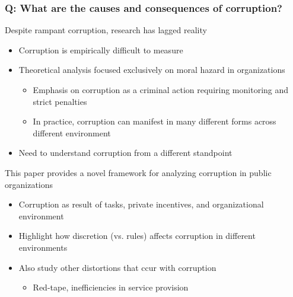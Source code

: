 \documentclass[aspectratio=169]{beamer}
\begin{document}
\begin{frame}
\frametitle{Q: What are the causes and consequences of corruption?}
Despite rampant corruption, research has lagged reality
\begin{itemize}\setlength\itemsep{3pt}
\item Corruption is empirically difficult to measure
\item Theoretical analysis focused exclusively on moral hazard in organizations
\begin{itemize}\setlength\itemsep{3pt}
\item Emphasis on corruption as a criminal action requiring monitoring and strict penalties 
  \item In practice, corruption can manifest in many different forms across different environment
\end{itemize}
\item Need to understand corruption from a different standpoint
\end{itemize}\medskip
This paper provides a novel framework for analyzing corruption in public organizations
\begin{itemize}\setlength\itemsep{3pt}
\item Corruption as result of tasks, private incentives, and organizational environment
\item Highlight how discretion (vs. rules) affects corruption in different environments
\item Also study other distortions that ccur with corruption 
\begin{itemize}\setlength\itemsep{3pt}
\item Red-tape, inefficiencies in service provision
\end{itemize}
\end{itemize}
\end{frame}
\end{document}
